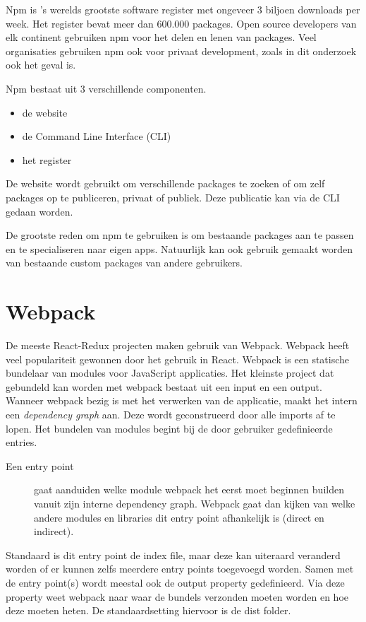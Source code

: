 Npm is 's werelds grootste software register met ongeveer 3 biljoen downloads per week. Het register bevat meer dan 600.000 packages. Open source developers van elk continent gebruiken npm voor het delen en lenen van packages. Veel organisaties gebruiken npm ook voor privaat development, zoals in dit onderzoek ook het geval is. 

Npm bestaat uit 3 verschillende componenten.
\begin{itemize}
	\item de website
	\item de Command Line Interface (CLI)
	\item het register
	
\end{itemize}

De website wordt gebruikt om verschillende packages te zoeken of om zelf packages op te publiceren, privaat of publiek. Deze publicatie kan via de CLI gedaan worden.

De grootste reden om npm te gebruiken is om bestaande packages aan te passen en te specialiseren naar eigen apps. Natuurlijk kan ook gebruik gemaakt worden van bestaande custom packages van andere gebruikers.
\autocite{npm}

\section{Webpack}
De meeste React-Redux projecten maken gebruik van Webpack. Webpack heeft veel populariteit gewonnen door het gebruik in React. Webpack is een statische bundelaar van modules voor JavaScript applicaties. Het kleinste project dat gebundeld kan worden met webpack bestaat uit een input en een output. Wanneer webpack bezig is met het verwerken van de applicatie, maakt het intern een \textit{dependency graph} aan. Deze wordt geconstrueerd door alle imports af te lopen. Het bundelen van modules begint bij de door gebruiker gedefinieerde entries.
\begin{description}
	\item[Een entry point] 
	 gaat aanduiden welke module webpack het eerst moet beginnen builden vanuit zijn interne dependency graph. Webpack gaat dan kijken van welke andere modules en libraries dit entry point afhankelijk is (direct en indirect). 
\end{description}

Standaard is dit entry point de index file, maar deze kan uiteraard veranderd worden of er kunnen zelfs meerdere entry points toegevoegd worden. Samen met de entry point(s) wordt meestal ook de output property gedefinieerd. Via deze property weet webpack naar waar de bundels verzonden moeten worden en hoe deze moeten heten. De standaardsetting hiervoor is de dist folder.


